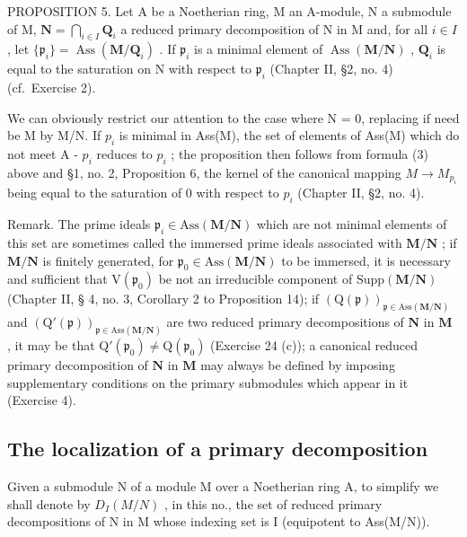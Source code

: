 PROPOSITION 5. Let A be a Noetherian ring, M an A-module, N a submodule of M, \(\mathbf{N} = \bigcap_{i \in I} \mathbf{Q}_i\) a reduced primary decomposition of N in M and, for all \(i \in I\) , let \(\{\mathfrak{p}_i\} = \operatorname{Ass}(\mathbf{M} / \mathbf{Q}_i)\) . If \(\mathfrak{p}_i\) is a minimal element of \(\operatorname{Ass}(\mathbf{M} / \mathbf{N})\) , \(\mathbf{Q}_i\) is equal to the saturation on N with respect to \(\mathfrak{p}_i\) (Chapter II, §2, no. 4) (cf.~Exercise 2).

We can obviously restrict our attention to the case where N = 0, replacing if need be M by M/N. If \(p_{i}\) is minimal in Ass(M), the set of elements of Ass(M) which do not meet A - \(p_{i}\) reduces to \(p_{i}\) ; the proposition then follows from formula (3) above and §1, no. 2, Proposition 6, the kernel of the canonical mapping \(M \to M_{p_{i}}\) being equal to the saturation of 0 with respect to \(p_{i}\) (Chapter II, §2, no. 4).

Remark. The prime ideals \(\mathfrak{p}_i\in\mathrm{Ass}(\mathbf{M}/\mathbf{N})\) which are not minimal elements of this set are sometimes called the immersed prime ideals associated with \(\mathbf{M}/\mathbf{N}\) ; if \(\mathbf{M}/\mathbf{N}\) is finitely generated, for \(\mathfrak{p}_0\in\mathrm{Ass}(\mathbf{M}/\mathbf{N})\) to be immersed, it is necessary and sufficient that \(\mathrm{V}(\mathfrak{p}_0)\) be not an irreducible component of \(\mathrm{Supp}(\mathbf{M}/\mathbf{N})\) (Chapter II, § 4, no. 3, Corollary 2 to Proposition 14); if \((\mathrm{Q}(\mathfrak{p}))_{\mathfrak{p}\in\mathrm{Ass}(\mathbf{M}/\mathbf{N})}\) and \((\mathrm{Q}'(\mathfrak{p}))_{\mathfrak{p}\in\mathrm{Ass}(\mathbf{M}/\mathbf{N})}\) are two reduced primary decompositions of \(\mathbf{N}\) in \(\mathbf{M}\) , it may be that \(\mathrm{Q}'(\mathfrak{p}_0)\neq\mathrm{Q}(\mathfrak{p}_0)\) (Exercise 24 (c)); a canonical reduced primary decomposition of \(\mathbf{N}\) in \(\mathbf{M}\) may always be defined by imposing supplementary conditions on the primary submodules which appear in it (Exercise 4).

\subsection{The localization of a primary decomposition}

Given a submodule N of a module M over a Noetherian ring A, to simplify we shall denote by \(D_{I}(M/N)\) , in this no., the set of reduced primary decompositions of N in M whose indexing set is I (equipotent to Ass(M/N)).

